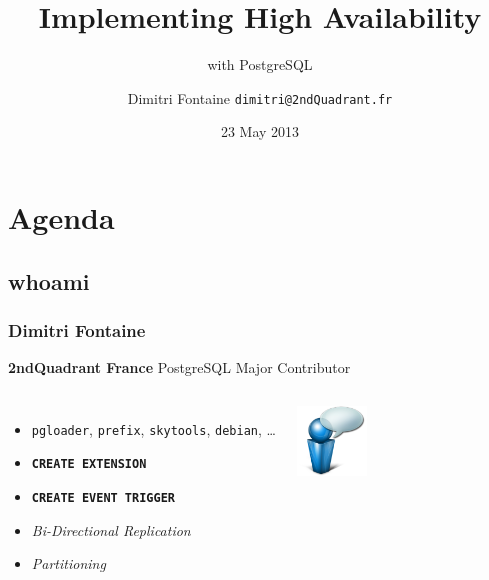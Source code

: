 \documentclass[english]{beamer}
\title{Implementing High Availability}
\subtitle{with PostgreSQL}
\author{Dimitri Fontaine \newline\tiny{\texttt{dimitri@2ndQuadrant.fr}}}
\date{23 May 2013}
\begin{document}
\frame{\titlepage}

\section{Agenda}
\subsection{whoami}
\frame{\tableofcontents[currentsection]}

\begin{frame}[fragile]
  \frametitle{Dimitri Fontaine}

  \begin{center}
    \textbf{2ndQuadrant France}
    \linebreak
    PostgreSQL Major Contributor
  \end{center}
  \linebreak

\begin{columns}[c]

  \begin{itemize}
   \item \texttt{pgloader}, \texttt{prefix}, \texttt{skytools}, \texttt{debian}, …
   \item \texttt{\textbf{CREATE EXTENSION}}
   \item \texttt{\textbf{CREATE EVENT TRIGGER}}
   \item \textit{Bi-Directional Replication}
   \item \textit{Partitioning}
  \end{itemize}  

\begin{center}
  \includegraphics[height=5em]{bulle-blue-icon.png}
\end{center}
\end{columns}
\end{frame}
\end{document}
